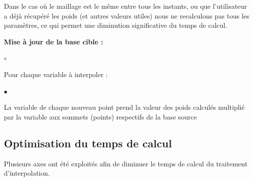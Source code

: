 \vspace{0.5cm}

\noindent Dans le cas où le maillage est le même entre tous les instants, ou que l'utilisateur a déjà récupéré les poids (et autres valeurs utiles) nous ne recalculons pas tous les paramètres, ce qui permet une diminution significative du temps de calcul.

\vspace{0.5cm}

\textbf{Mise à jour de la base cible :}
\begin{list}{$\circ$}{\leftmargin=0.5cm  \itemsep=0cm}
    \item Pour chaque variable à interpoler :
    \begin{list}{$\bullet$}{\leftmargin=0.5cm  \itemsep=0cm}
        \item La variable de chaque nouveau point prend la valeur des poids calculés multiplié par la variable aux sommets (points) respectifs de la base source
    \end{list}
\end{list}




\subsection{Optimisation du temps de calcul}

Plusieurs axes ont été exploités afin de diminuer le temps de calcul du traitement d'interpolation.


